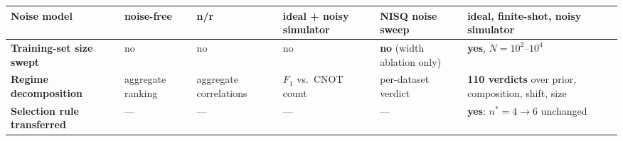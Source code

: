 \begin{table}[t]
\begin{tabular}{@{}l p{2.05cm} p{2.05cm} p{2.05cm} p{2.35cm} p{2.6cm}@{}}
Noise model     & noise-free         & n/r                & ideal + noisy simulator & NISQ noise sweep & ideal, finite-shot, noisy simulator \\
\midrule
\textbf{Training-set size swept} & no & no                & no                 & \textbf{no} (width ablation only) & \textbf{yes}, $N{=}10^2$--$10^4$ \\
\textbf{Regime decomposition} & aggregate ranking & aggregate correlations & $F_1$ vs.\ CNOT count & per-dataset verdict & \textbf{110 verdicts} over prior, composition, shift, size \\
\textbf{Selection rule transferred} & --- & --- & ---           & ---                & \textbf{yes}: $n^\ast{=}4\!\to\!6$ unchanged \\
\bottomrule
\end{tabular}
\end{table}
